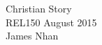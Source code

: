 \documentclass{article}
\begin{document}
\begin{center}
    {\large Christian Story} \\
    REL150  August 2015 \\
    James Nhan
\end{center}

\end{document}
